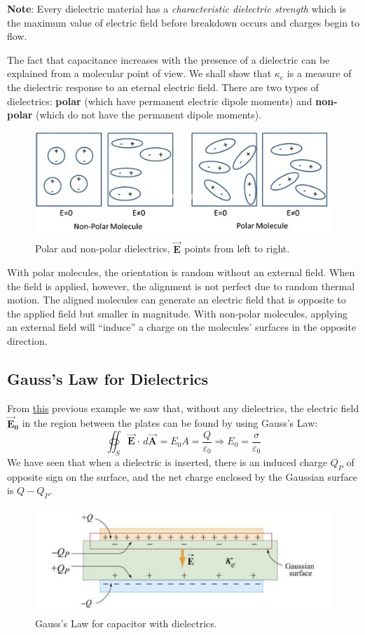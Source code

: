\documentclass[11pt, letterpaper]{article}
\newcommand{\bv}[2][]{\bm{\vec{#2}_{#1}}}
\begin{document}
\textbf{Note}: Every dielectric material has a \textit{characteristic dielectric strength} which is the maximum value of electric field before breakdown occurs and charges begin to flow. 

The fact that capacitance increases with the presence of a dielectric can be explained from a molecular point of view. We shall show that $\kappa_e$ is a measure of the dielectric response to an eternal electric field. There are two types of dielectrics: \textbf{polar} (which have permanent electric dipole moments) and \textbf{non-polar} (which do not have the permanent dipole moments).  
\begin{figure}
	\centering
	\includegraphics[scale=0.5]{polar.jpg}
	\caption{Polar and non-polar dielectrics, $\bv{E}$ points from left to right.}
	\label{fig:polar}
\end{figure}

With polar molecules, the orientation is random without an external field. When the field is applied, however, the alignment is not perfect due to random thermal motion. The aligned molecules can generate an electric field that is opposite to the applied field but smaller in magnitude. With non-polar molecules, applying an external field will ``induce'' a charge on the molecules' surfaces in the opposite direction. 

\subsection{Gauss's Law for Dielectrics}
From \hyperref[fig:gauss]{this} previous example we saw that, without any dielectrics, the electric field $\bv[0]{E}$ in the region between the plates can be found by using Gauss's Law: \[\oiint_S\bv{E}\cdot\, d\bv{A} = E_0A = \frac{Q}{\varepsilon_0}\Rightarrow E_0 = \frac{\sigma}{\varepsilon_0} \] We have seen that when a dielectric is inserted, there is an induced charge $Q_P$ of opposite sign on the surface, and the net charge enclosed by the Gaussian surface is $Q - Q_P$. 
\begin{figure}[h!]
	\centering
	\includegraphics[scale=0.4]{dielectric.png}
	\caption{Gauss's Law for capacitor with dielectrics.}
	\label{fig:dielectric}
\end{figure}
\end{document}
